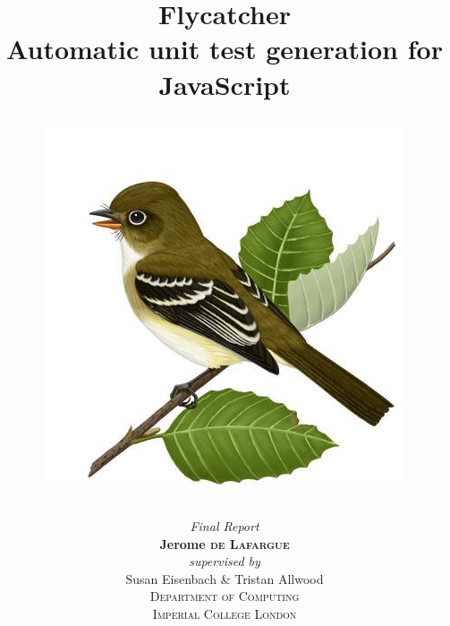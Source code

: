 \title
{
	{\Huge \textsf{Flycatcher} \\[0.2cm]}
	{\large \textsf{Automatic unit test generation for JavaScript}\\[0.5cm]}
	\begin{figure}[h]
		\centering
		\includegraphics[scale=0.3]{./components/preamble/flycatcher.jpg}
	\end{figure}
}
\author
{	
	{\emph{Final Report}}\\[6.5cm]
	{\large \textbf{Jerome \textsc{de Lafargue}}}\\[0.2cm]
	\emph{supervised by}\\
	Susan Eisenbach \& Tristan Allwood\\[1cm]
	\textsc{\normalsize Department of Computing}\\
	\textsc{\large Imperial College London}
}


\date{}
\pagestyle{empty}
\maketitle

